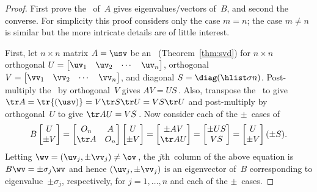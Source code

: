 \begin{proof} 
First prove the \svd\ of~\(A\) gives eigenvalues\slash vectors of~\(B\), and second the converse.
For simplicity this proof considers only the case \(m=n\); the case \(m\neq n\) is similar but the more intricate details are of little interest.

First, let \(n\times n\) matrix \(A=\usv\) be an \svd\ (Theorem~\ref{thm:svd}) for \(n\times n\) orthogonal \(U=\begin{bmatrix} \uv_1&\uv_2&\cdots&\uv_n \end{bmatrix}\),  orthogonal \(V=\begin{bmatrix} \vv_1&\vv_2&\cdots&\vv_n \end{bmatrix}\), and diagonal \(S=\diag(\hlist\sigma n)\).
Post-multiply the \svd\ by orthogonal~\(V\) gives \(AV=US\)\,.
Also, transpose the \svd\ to give \(\tr A=\tr{(\usv)}=V\tr S\tr U=VS\tr U\) and post-multiply by orthogonal~\(U\) to give \(\tr AU=VS\)\,.
Now consider each of the \(\pm\)~cases of
\begin{equation*}
B\begin{bmatrix} U\\\pm V \end{bmatrix}
=\begin{bmatrix} O_n&A\\\tr A&O_n \end{bmatrix}\begin{bmatrix} U\\\pm V \end{bmatrix}
=\begin{bmatrix} \pm AV\\\tr AU \end{bmatrix}
=\begin{bmatrix} \pm US\\VS \end{bmatrix}
=\begin{bmatrix} U\\\pm V \end{bmatrix}(\pm S).
\end{equation*}
Letting \(\wv=(\uv_j,\pm\vv_j)\neq\ov\)\,, the \(j\)th~column of the above equation is \(B\wv=\pm\sigma_j\wv\) and hence \((\uv_j,\pm\vv_j)\) is an eigenvector of~\(B\) corresponding to eigenvalue~\(\pm\sigma_j\), respectively, for \(j=1,\ldots,n\) and each of the \(\pm\)~cases.


\end{proof}

